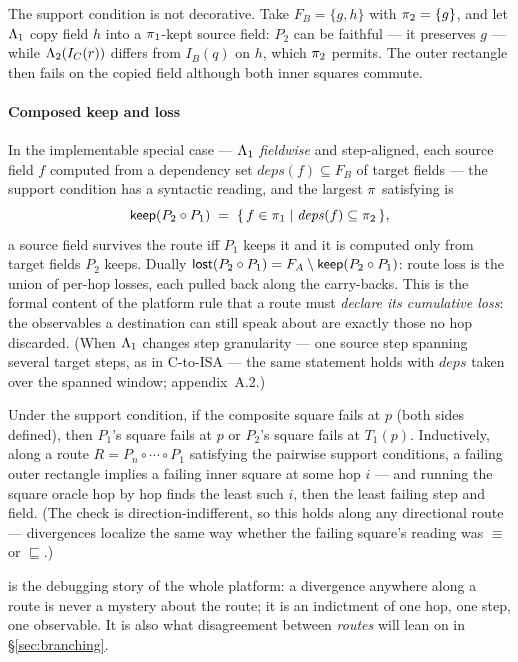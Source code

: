 The support condition is not decorative. Take $F_B = \{g, h\}$ with
$\pi_2 = \{g\}$, and let $\Lambda_1$ copy field $h$ into a
$\pi_1$-kept source field: $P_2$ can be faithful --- it preserves
$g$ --- while $\Lambda_2(I_C(r))$ differs from $I_B(q)$ on $h$, which
$\pi_2$ permits. The outer rectangle then fails on the copied field
although both inner squares commute.

\paragraph{Composed keep and loss}
In the implementable special case --- $\Lambda_1$ \emph{fieldwise} and
step-aligned, each source field $f$ computed from a dependency set
$\mathit{deps}(f) \subseteq F_B$ of target fields --- the support
condition has a syntactic reading, and the largest $\pi$ satisfying
 is
\[
\mathsf{keep}(P_2 \circ P_1) \;=\;
  \{\, f \in \pi_1 \mid \mathit{deps}(f) \subseteq \pi_2 \,\},
\]
a source field survives the route iff $P_1$ keeps it and it is computed
only from target fields $P_2$ keeps. Dually
$\mathsf{lost}(P_2 \circ P_1) = F_A \setminus \mathsf{keep}(P_2 \circ P_1)$: route loss is
the union of per-hop losses, each pulled back along the carry-backs. This
is the formal content of the platform rule that a route must \emph{declare
its cumulative loss}: the observables a destination can still speak about
are exactly those no hop discarded. (When $\Lambda_1$ changes step
granularity --- one source step spanning several target steps, as in
C-to-ISA --- the same statement holds with $\mathit{deps}$ taken over the
spanned window; appendix~A.2.)

\begin{corollary}[Localization]
\label{cor:localization}
Under the support condition, if the composite square fails at $p$ (both
sides defined), then $P_1$'s square fails at $p$ or $P_2$'s square fails
at $T_1(p)$. Inductively, along a route
$R = P_n \circ \cdots \circ P_1$ satisfying the pairwise support
conditions, a failing outer rectangle implies a failing inner square at
some hop $i$ --- and running the square oracle hop by hop finds the
least such $i$, then the least failing step and field. (The check is
direction-indifferent, so this holds along any directional route ---
divergences localize the same way whether the failing square's reading
was $\equiv$ or $\sqsubseteq$.)
\end{corollary}

 is the debugging story of the whole platform: a
divergence anywhere along a route is never a mystery about the route; it
is an indictment of one hop, one step, one observable. It is also what
disagreement between \emph{routes} will lean on in \S\ref{sec:branching}.

